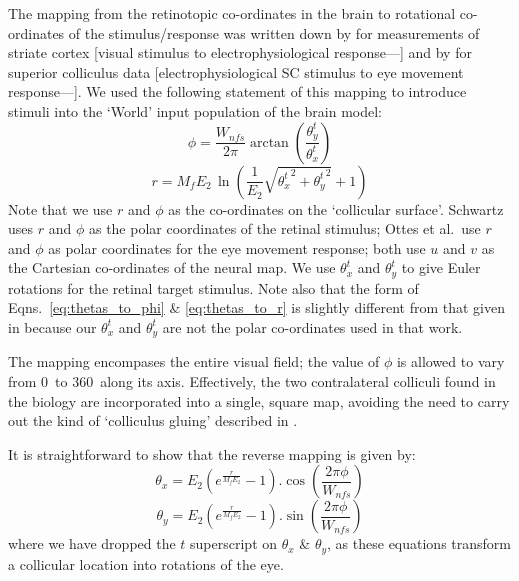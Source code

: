 \documentclass{frontiersSCNS}
\begin{document}
The mapping from the retinotopic co-ordinates in the brain to
rotational co-ordinates of the stimulus/response was written down by
\cite{schwartz_spatial_1977,eric_l._schwartz_computational_1980}
for measurements of striate cortex [visual stimulus to
electrophysiological response---\cite{daniel_representation_1961,
talbot_physiological_1941}] and by \cite{ottes_visuomotor_1986} for
superior colliculus data [electrophysiological SC stimulus to eye
movement response---\cite{robinson_eye_1972}].
We used the following statement of this mapping to introduce stimuli
into the `World' input population of the brain model:
\begin{equation}\label{eq:thetas_to_phi}
   \phi = \frac{W_{nfs}} {2 \pi}\arctan\left(\frac{\theta_{y}^{t}}{\theta_{x}^{t}}\right)
\end{equation}
\begin{equation}\label{eq:thetas_to_r}
   r = M_fE_2\,\ln\left(\frac{1}{E_2}\sqrt{{\theta_{x}^{t}}^2 + {\theta_{y}^{t}}^2}+1\right)
\end{equation}
Note that we use $r$ and $\phi$ as the co-ordinates on the `collicular
surface'. Schwartz uses $r$ and $\phi$ as the polar coordinates of the
retinal stimulus; Ottes et al.~use $r$ and $\phi$ as polar coordinates
for the eye movement response; both use $u$ and $v$ as the Cartesian
co-ordinates of the neural map. We use $\theta_{x}^{t}$ and
$\theta_{y}^{t}$ to give Euler rotations for the retinal target
stimulus. Note also that the form of
Eqns.~\ref{eq:thetas_to_phi} \& \ref{eq:thetas_to_r} is slightly
different from that given in
\cite{ottes_visuomotor_1986} because our $\theta_{x}^{t}$ and
$\theta_{y}^{t}$ are not the polar co-ordinates used in that work.

The mapping encompases the entire visual field; the value of $\phi$ is
allowed to vary from 0\dg~to 360\dg~along its axis.  Effectively, the
two contralateral colliculi found in the biology are incorporated into
a single, square map, avoiding the need to carry out the kind of
`colliculus gluing' described in \cite{tabareau_geometry_2007}.

It is straightforward to show that the reverse mapping is given by:
\begin{equation}
   \theta_x = E_2 \left(e^{\frac{r}{M_f E_2}} - 1\right).\cos\left(\frac{2 \pi \phi}{W_{nfs}}\right)
\end{equation}
\begin{equation}
   \theta_y = E_2 \left(e^{\frac{r}{M_f E_2}} - 1\right).\sin\left(\frac{2 \pi \phi}{W_{nfs}}\right)
\end{equation}
where we have dropped the $t$ superscript on $\theta_x$ \& $\theta_y$,
as these equations transform a collicular location into rotations of
the eye.
\end{document}

